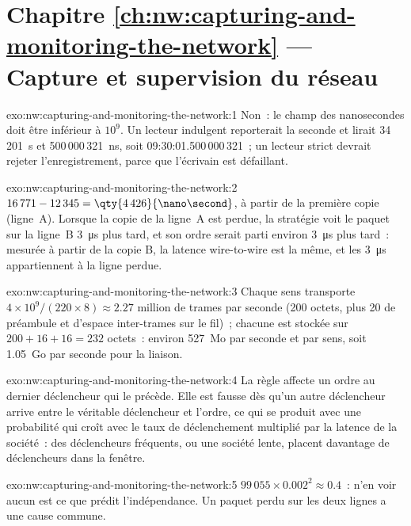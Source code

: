 \section*{Chapitre \ref{ch:nw:capturing-and-monitoring-the-network} --- Capture et supervision du réseau}

\begin{solution}{exo:nw:capturing-and-monitoring-the-network:1}
Non~: le champ des nanosecondes doit être inférieur à $10^9$. Un lecteur indulgent reporterait la seconde et lirait 34\,201~s et 500\,000\,321~ns,
soit 09:30:01.500\,000\,321~; un lecteur strict devrait rejeter l'enregistrement, parce que l'écrivain est défaillant.
\end{solution}

\begin{solution}{exo:nw:capturing-and-monitoring-the-network:2}
$16\,771 - 12\,345 = \qty{4\,426}{\nano\second}$, à partir de la première copie (ligne~A). Lorsque la copie de la ligne~A est perdue, la stratégie voit le paquet sur la ligne~B
\qty{3}{\micro\second} plus tard, et son ordre serait parti environ \qty{3}{\micro\second} plus tard~: mesurée à partir de la copie B, la latence wire-to-wire
est la même, et les \qty{3}{\micro\second} appartiennent à la ligne perdue.
\end{solution}

\begin{solution}{exo:nw:capturing-and-monitoring-the-network:3}
Chaque sens transporte $4 \times 10^9 / (220 \times 8) \approx 2.27$ million de trames par seconde (200 octets, plus 20 de préambule et d'espace inter-trames sur
le fil)~; chacune est stockée sur $200 + 16 + 16 = 232$ octets~: environ 527~Mo par seconde et par sens, soit 1.05~Go par seconde pour la liaison.
\end{solution}

\begin{solution}{exo:nw:capturing-and-monitoring-the-network:4}
La règle affecte un ordre au dernier déclencheur qui le précède. Elle est fausse dès qu'un autre déclencheur arrive entre le véritable déclencheur et
l'ordre, ce qui se produit avec une probabilité qui croît avec le taux de déclenchement multiplié par la latence de la société~: des déclencheurs
fréquents, ou une société lente, placent davantage de déclencheurs dans la fenêtre.
\end{solution}

\begin{solution}{exo:nw:capturing-and-monitoring-the-network:5}
$99\,055 \times 0.002^2 \approx 0.4$~: n'en voir aucun est ce que prédit l'indépendance. Un paquet perdu sur les deux lignes a une cause commune.
\end{solution}

